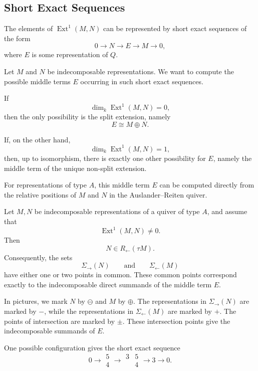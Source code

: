 \documentclass[11pt, a4paper]{report}
\begin{document}
\subsection{Short Exact Sequences}

The elements of \(\operatorname{Ext}^1(M,N)\) can be represented by short exact
sequences of the form
\[
    0
    \longrightarrow
    N
    \longrightarrow
    E
    \longrightarrow
    M
    \longrightarrow
    0,
\]
where \(E\) is some representation of \(Q\).

Let \(M\) and \(N\) be indecomposable representations. We want to compute the
possible middle terms \(E\) occurring in such short exact sequences.

If
\[
    \dim_k \operatorname{Ext}^1(M,N)=0,
\]
then the only possibility is the split extension, namely
\[
    E\cong M\oplus N.
\]

If, on the other hand,
\[
    \dim_k \operatorname{Ext}^1(M,N)=1,
\]
then, up to isomorphism, there is exactly one other possibility for \(E\), namely
the middle term of the unique non-split extension.

For representations of type \(A\), this middle term \(E\) can be computed directly
from the relative positions of \(M\) and \(N\) in the Auslander--Reiten quiver.

\begin{proposition}
    Let \(M,N\) be indecomposable representations of a quiver of type \(A\), and
    assume that
    \[
        \operatorname{Ext}^1(M,N)\neq 0.
    \]
    Then
    \[
        N\in R_{\leftarrow}(\tau M).
    \]
    Consequently, the sets
    \[
        \Sigma_{\rightarrow}(N)
        \qquad\text{and}\qquad
        \Sigma_{\leftarrow}(M)
    \]
    have either one or two points in common. These common points correspond
    exactly to the indecomposable direct summands of the middle term \(E\).
\end{proposition}

In pictures, we mark \(N\) by \(\ominus\) and \(M\) by \(\oplus\). The
representations in \(\Sigma_{\rightarrow}(N)\) are marked by \(-\), while the
representations in \(\Sigma_{\leftarrow}(M)\) are marked by \(+\). The points of
intersection are marked by \(\pm\). These intersection points give the
indecomposable summands of \(E\).

\begin{example}
    One possible configuration gives the short exact sequence
    \[
        0
        \longrightarrow
        \begin{matrix}
            5\\[-1mm]
            4
        \end{matrix}
        \longrightarrow
        \begin{matrix}
            3 & 5\\[-1mm]
              & 4
        \end{matrix}
        \longrightarrow
        3
        \longrightarrow
        0.
    \]
\end{example}
\end{document}
